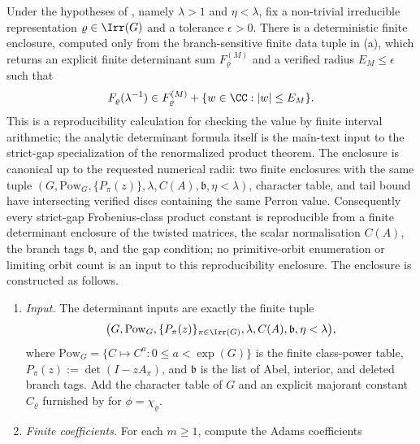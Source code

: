 \begin{lemma}
  \label{prop:fixed-label-perron-finite-algorithm}
  Under the hypotheses of , namely
  \(\lambda>1\) and \(\eta<\lambda\), fix a
  non-trivial irreducible representation \(\varrho\in\Irr(G)\) and a tolerance
  \(\epsilon>0\).  There is a deterministic finite enclosure, computed only
  from the branch-sensitive finite data tuple in \textup{(a)}, which returns an
  explicit finite determinant sum \(F_\varrho^{(M)}\) and
  a verified radius \(E_M\le\epsilon\) such that
  \[
    F_\varrho(\lambda^{-1})
    \in F_\varrho^{(M)}+\{w\in\CC:|w|\le E_M\}.
  \]
  This is a reproducibility calculation for checking the
   value by finite interval
  arithmetic; the analytic determinant formula itself is the main-text input
  to the strict-gap specialization of the renormalized product theorem.  The enclosure is canonical up to the requested
  numerical radii: two finite
  enclosures with the same tuple \((G,\mathrm{Pow}_G,\{P_\pi(z)\},\lambda,
  C(A),\mathfrak b,\eta<\lambda)\), character table, and tail bound have intersecting verified
  discs containing the same Perron value.  Consequently every
  strict-gap Frobenius-class product constant is reproducible from a
  finite determinant enclosure of the twisted matrices, the scalar
  normalisation \(C(A)\), the branch tags \(\mathfrak b\), and the gap
  condition; no primitive-orbit enumeration or limiting orbit count is an
  input to this reproducibility enclosure.  The enclosure is constructed as
  follows.
  \begin{enumerate}[label=\textup{(\alph*)},leftmargin=*]
    \item \emph{Input.}  The determinant inputs are exactly the finite tuple
      \[
        \bigl(G,\mathrm{Pow}_G,\{P_\pi(z)\}_{\pi\in\Irr(G)},
          \lambda,C(A),\mathfrak b,\eta<\lambda\bigr),
      \]
      where \(\mathrm{Pow}_G=\{C\mapsto C^a:0\le a<\exp(G)\}\) is the finite
      class-power table,
      \(P_\pi(z):=\det(I-zA_\pi)\), and \(\mathfrak b\) is the list of Abel,
      interior, and deleted branch tags.  Add the character table of \(G\) and
      an explicit majorant constant \(C_\varrho\) furnished by
       for
      \(\phi=\chi_\varrho\).
    \item \emph{Finite coefficients.}  For each \(m\ge1\), compute the Adams coefficients
      \begin{equation}\label{eq:fixed-label-algorithm-adams-coefficients}

\end{equation}
\end{enumerate}
\end{lemma}
